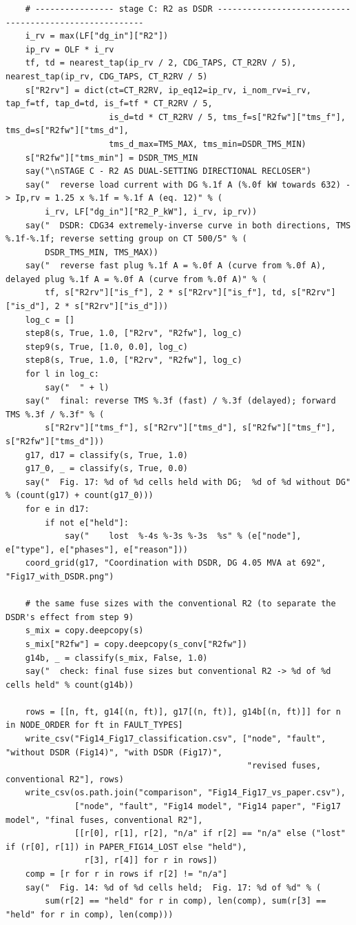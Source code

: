 \documentclass[12pt,a4paper]{article}
\begin{document}
\begin{lstlisting}
    # ---------------- stage C: R2 as DSDR -------------------------------------------------------
    i_rv = max(LF["dg_in"]["R2"])
    ip_rv = OLF * i_rv
    tf, td = nearest_tap(ip_rv / 2, CDG_TAPS, CT_R2RV / 5), nearest_tap(ip_rv, CDG_TAPS, CT_R2RV / 5)
    s["R2rv"] = dict(ct=CT_R2RV, ip_eq12=ip_rv, i_nom_rv=i_rv, tap_f=tf, tap_d=td, is_f=tf * CT_R2RV / 5,
                     is_d=td * CT_R2RV / 5, tms_f=s["R2fw"]["tms_f"], tms_d=s["R2fw"]["tms_d"],
                     tms_d_max=TMS_MAX, tms_min=DSDR_TMS_MIN)
    s["R2fw"]["tms_min"] = DSDR_TMS_MIN
    say("\nSTAGE C - R2 AS DUAL-SETTING DIRECTIONAL RECLOSER")
    say("  reverse load current with DG %.1f A (%.0f kW towards 632) -> Ip,rv = 1.25 x %.1f = %.1f A (eq. 12)" % (
        i_rv, LF["dg_in"]["R2_P_kW"], i_rv, ip_rv))
    say("  DSDR: CDG34 extremely-inverse curve in both directions, TMS %.1f-%.1f; reverse setting group on CT 500/5" % (
        DSDR_TMS_MIN, TMS_MAX))
    say("  reverse fast plug %.1f A = %.0f A (curve from %.0f A), delayed plug %.1f A = %.0f A (curve from %.0f A)" % (
        tf, s["R2rv"]["is_f"], 2 * s["R2rv"]["is_f"], td, s["R2rv"]["is_d"], 2 * s["R2rv"]["is_d"]))
    log_c = []
    step8(s, True, 1.0, ["R2rv", "R2fw"], log_c)
    step9(s, True, [1.0, 0.0], log_c)
    step8(s, True, 1.0, ["R2rv", "R2fw"], log_c)
    for l in log_c:
        say("  " + l)
    say("  final: reverse TMS %.3f (fast) / %.3f (delayed); forward TMS %.3f / %.3f" % (
        s["R2rv"]["tms_f"], s["R2rv"]["tms_d"], s["R2fw"]["tms_f"], s["R2fw"]["tms_d"]))
    g17, d17 = classify(s, True, 1.0)
    g17_0, _ = classify(s, True, 0.0)
    say("  Fig. 17: %d of %d cells held with DG;  %d of %d without DG" % (count(g17) + count(g17_0)))
    for e in d17:
        if not e["held"]:
            say("    lost  %-4s %-3s %-3s  %s" % (e["node"], e["type"], e["phases"], e["reason"]))
    coord_grid(g17, "Coordination with DSDR, DG 4.05 MVA at 692", "Fig17_with_DSDR.png")

    # the same fuse sizes with the conventional R2 (to separate the DSDR's effect from step 9)
    s_mix = copy.deepcopy(s)
    s_mix["R2fw"] = copy.deepcopy(s_conv["R2fw"])
    g14b, _ = classify(s_mix, False, 1.0)
    say("  check: final fuse sizes but conventional R2 -> %d of %d cells held" % count(g14b))

    rows = [[n, ft, g14[(n, ft)], g17[(n, ft)], g14b[(n, ft)]] for n in NODE_ORDER for ft in FAULT_TYPES]
    write_csv("Fig14_Fig17_classification.csv", ["node", "fault", "without DSDR (Fig14)", "with DSDR (Fig17)",
                                                 "revised fuses, conventional R2"], rows)
    write_csv(os.path.join("comparison", "Fig14_Fig17_vs_paper.csv"),
              ["node", "fault", "Fig14 model", "Fig14 paper", "Fig17 model", "final fuses, conventional R2"],
              [[r[0], r[1], r[2], "n/a" if r[2] == "n/a" else ("lost" if (r[0], r[1]) in PAPER_FIG14_LOST else "held"),
                r[3], r[4]] for r in rows])
    comp = [r for r in rows if r[2] != "n/a"]
    say("  Fig. 14: %d of %d cells held;  Fig. 17: %d of %d" % (
        sum(r[2] == "held" for r in comp), len(comp), sum(r[3] == "held" for r in comp), len(comp)))


\end{lstlisting}
\end{document}
